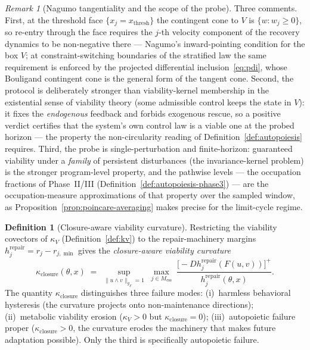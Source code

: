 \documentclass[11pt,a4paper]{article}
\theoremstyle{plain}
\theoremstyle{definition}
\newtheorem{definition}[theorem]{Definition}
\theoremstyle{remark}
\newtheorem{remark}[theorem]{Remark}
\newcommand{\kk}{\kappa_{\!V}}
\begin{document}
\begin{remark}[Nagumo tangentiality and the scope of the probe]
\label{rem:closure-viability}
Three comments. First, at the threshold face
$\{x_j = x_{\mathrm{thresh}}\}$ the contingent cone to $V$ is
$\{w : w_j \geq 0\}$, so re-entry through the face requires the
$j$-th velocity component of the recovery dynamics to be
non-negative there --- Nagumo's inward-pointing condition for the
box $V$; at constraint-switching boundaries of the stratified law
the same requirement is enforced by the projected differential
inclusion~\eqref{eq:pdi}, whose Bouligand contingent cone is the
general form of the tangent cone. Second, the protocol is
deliberately stronger than viability-kernel membership in the
existential sense of viability theory (some admissible control
keeps the state in $V$): it fixes the \emph{endogenous} feedback
and forbids exogenous rescue, so a positive verdict certifies that
the system's own control law is a viable one at the probed horizon
--- the property the non-circularity reading of
Definition~\ref{def:autopoiesis} requires. Third, the probe is
single-perturbation and finite-horizon: guaranteed viability under
a \emph{family} of persistent disturbances (the invariance-kernel
problem) is the stronger program-level property, and the pathwise
levels --- the occupation fractions of Phase~II/III
(Definition~\ref{def:autopoiesis-phase3}) --- are the
occupation-measure approximations of that property over the sampled
window, as Proposition~\ref{prop:poincare-averaging} makes precise
for the limit-cycle regime.
\end{remark}

\begin{definition}[Closure-aware viability curvature]
\label{def:kappa-closure}
Restricting the viability covectors of $\kk$
(Definition~\ref{def:kv}) to the repair-machinery
margins $h_j^{\mathrm{repair}} = r_j - r_{j,\min}$ gives the
\emph{closure-aware viability curvature}
\begin{equation}\label{eq:kappa-closure}
  \kappa_{\mathrm{closure}}(\theta, x) \;=\;
  \sup_{\|u \wedge v\|_{g_F} = 1}\;
  \max_{j \in M_{\mathrm{ess}}}\;
  \frac{\bigl[-D h_j^{\mathrm{repair}}(F(u, v))\bigr]^+}{h_j^{\mathrm{repair}}(\theta, x)}.
\end{equation}
The quantity $\kappa_{\mathrm{closure}}$ distinguishes three failure
modes: (i)~harmless behavioral hysteresis (the curvature projects onto
non-maintenance directions); (ii)~metabolic viability erosion
($\kk > 0$ but $\kappa_{\mathrm{closure}} = 0$); (iii)~autopoietic
failure proper ($\kappa_{\mathrm{closure}} > 0$, the curvature erodes
the machinery that makes future adaptation possible). Only the third
is specifically autopoietic failure.
\end{definition}
\end{document}
